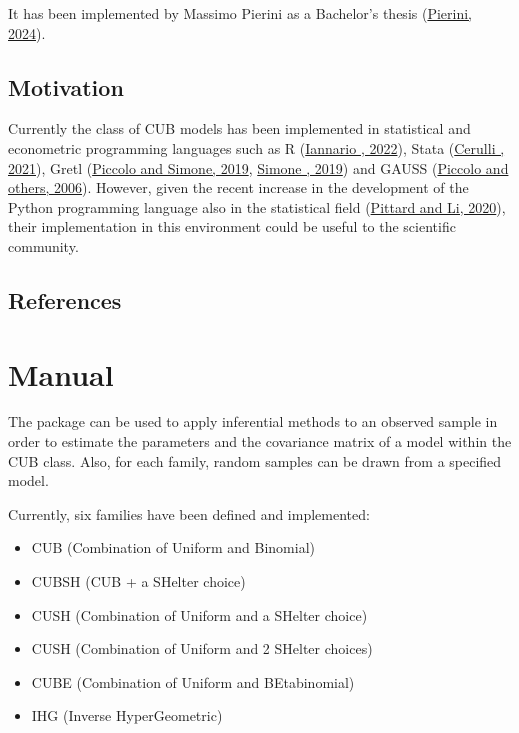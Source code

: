 \documentclass[letterpaper,10pt,english]{sphinxmanual}
\begin{document}
\sphinxAtStartPar
It has been implemented by Massimo Pierini as a Bachelor’s thesis (\hyperlink{cite.intro:id50}{Pierini, 2024}).


\section{Motivation}
\label{\detokenize{intro:motivation}}
\sphinxAtStartPar
Currently the class of CUB models has been implemented in statistical and econometric programming languages
such as R (\hyperlink{cite.intro:id31}{Iannario , 2022}), Stata (\hyperlink{cite.intro:id37}{Cerulli , 2021}),
Gretl (\hyperlink{cite.intro:id16}{Piccolo and Simone, 2019}, \hyperlink{cite.intro:id38}{Simone , 2019})
and GAUSS (\hyperlink{cite.intro:id20}{Piccolo and others, 2006}).  However, given the recent increase in the development
of the Python programming language also in the statistical field (\hyperlink{cite.intro:id36}{Pittard and Li, 2020}),
their implementation in
this environment could be useful to the scientific community.


\section{References}
\label{\detokenize{intro:references}}
\sphinxstepscope


\chapter{Manual}
\label{\detokenize{manual:manual}}\label{\detokenize{manual::doc}}
\sphinxAtStartPar
The package  can be used to apply inferential methods to an observed sample in order to
estimate the parameters and the covariance matrix of a model within the CUB class. Also, for each family,
random samples can be drawn from a specified model.

\sphinxAtStartPar
Currently, six families have been defined and implemented:
\begin{itemize}
\item {} 
\sphinxAtStartPar
CUB (Combination of Uniform and Binomial)

\item {} 
\sphinxAtStartPar
CUBSH (CUB + a SHelter choice)

\item {} 
\sphinxAtStartPar
CUSH (Combination of Uniform and a SHelter choice)

\item {} 
\sphinxhyphen{}CUSH (Combination of Uniform and 2 SHelter choices)

\item {} 
\sphinxAtStartPar
CUBE (Combination of Uniform and BEta\sphinxhyphen{}binomial)

\item {} 
\sphinxAtStartPar
IHG (Inverse HyperGeometric)

\end{itemize}
\end{document}

